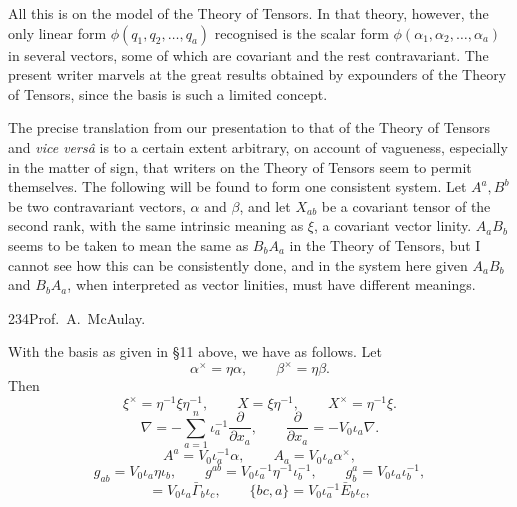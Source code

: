 \documentclass[11pt]{article}
\begin{document}
\indent All this is on the model of the Theory of Tensors. In that theory, however, the only linear form $\phi(q_1,q_2,\ldots,q_a)$ recognised is the scalar form $\phi(\alpha_1,\alpha_2,\ldots,\alpha_a)$ in several vectors, some of which are covariant and the rest contravariant. The present writer marvels at the great results obtained by expounders of the Theory of Tensors, since the basis is such a limited concept.

\indent The precise translation from our presentation to that of the Theory of Tensors and \emph{vice vers\^a} is to a certain extent arbitrary, on account of vagueness, especially in the matter of sign, that writers on the Theory of Tensors seem to permit themselves. The following will be found to form one consistent system. Let $A^a,B^b$ be two contravariant vectors, $\alpha$ and $\beta$, and let $X_{ab}$ be a covariant tensor of the second rank, with the same intrinsic meaning as $\xi$, a covariant vector linity. $A_aB_b$ seems to be taken to mean the same as $B_bA_a$ in the Theory of Tensors, but I cannot see how this can be consistently done, and in the system here given $A_aB_b$ and $B_bA_a$, when interpreted as vector linities, must have different meanings.
\newpage\thispagestyle{empty}\begin{center}234\hfill Prof.\ A.\ McAulay.\end{center}
With the basis as given in \S11 above, we have as follows. Let
\begin{equation}\alpha^\times=\eta\alpha,\qquad \beta^\times=\eta\beta.\tag{1}\end{equation}
Then
\begin{equation}\xi^\times=\eta^{-1}\xi\eta^{-1},\qquad X=\xi\eta^{-1},\qquad X^\times=\eta^{-1}\xi.\tag{2}\end{equation}
\begin{equation}\nabla=-\sum_{a=1}^n\iota_a^{-1}\frac{\partial}{\partial x_a},\qquad \frac{\partial}{\partial x_a}=-V_0\iota_a\nabla.\tag{3}\end{equation}
\begin{equation}A^a=V_0\iota_a^{-1}\alpha,\qquad A_a=V_0\iota_a\alpha^\times,\tag{4}\end{equation}
\begin{equation}g_{ab}=V_0\iota_a\eta\iota_b,\qquad g^{ab}=V_0\iota_a^{-1}\eta^{-1}\iota_b^{-1},\qquad g_b^a=V_0\iota_a\iota_b^{-1},\tag{5}\end{equation}
\begin{equation}[bc,a]=V_0\iota_a\bar\Gamma_b\iota_c,\qquad \{bc,a\}=V_0\iota_a^{-1}\bar E_b\iota_c,\tag{6}\end{equation}
\end{document}
